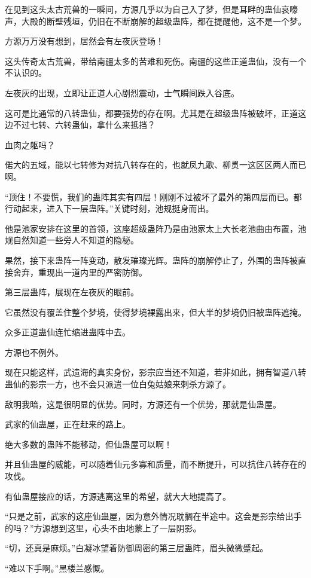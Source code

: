 \begin{this_body}
在见到这头太古荒兽的一瞬间，方源几乎以为自己入了梦，但是耳畔的蛊仙哀嚎声，大殿的断壁残垣，仍旧在不断崩解的超级蛊阵，都在提醒他，这不是一个梦。

方源万万没有想到，居然会有左夜灰登场！

这头传奇太古荒兽，带给南疆太多的苦难和死伤。南疆的这些正道蛊仙，没有一个不认识的。

左夜灰的出现，立即让正道人心剧烈震动，士气瞬间跌入谷底。

这可是比通常的八转蛊仙，都要强势的存在啊。尤其是在超级蛊阵被破坏，正道这边不过七转、六转蛊仙，拿什么来抵挡？

血肉之躯吗？

偌大的五域，能以七转修为对抗八转存在的，也就凤九歌、柳贯一这区区两人而已啊。

“顶住！不要慌，我们的蛊阵其实有四层！刚刚不过被坏了最外的第四层而已。都行动起来，进入下一层蛊阵。”关键时刻，池规挺身而出。

他是池家安排在这里的首领，这座超级蛊阵乃是由池家太上大长老池曲由布置，池规自然知道一些旁人不知道的隐秘。

果然，接下来蛊阵一阵变动，散发璀璨光辉。蛊阵的崩解停止了，外围的蛊阵被直接舍弃，重现出一道内里的严密防御。

第三层蛊阵，展现在左夜灰的眼前。

它虽然没有覆盖住整个梦境，使得梦境裸露出来，但大半的梦境仍旧被蛊阵遮掩。

众多正道蛊仙连忙缩进蛊阵中去。

方源也不例外。

现在只能这样，武遗海的真实身份，影宗应当还不知道，若非如此，拥有智道八转蛊仙的影宗一方，也不会只派遣一位白兔姑娘来刺杀方源了。

敌明我暗，这是很明显的优势。同时，方源还有一个优势，那就是仙蛊屋。

武家的仙蛊屋，正在赶来的路上。

绝大多数的蛊阵不能移动，但仙蛊屋可以啊！

并且仙蛊屋的威能，可以随着仙元多寡和质量，而不断提升，可以抗住八转存在的攻伐。

有仙蛊屋接应的话，方源逃离这里的希望，就大大地提高了。

“只是之前，武家的这座仙蛊屋，因为意外情况耽搁在半途中。这会是影宗给出手的吗？”方源想到这里，心头不由地蒙上了一层阴影。

“切，还真是麻烦。”白凝冰望着防御周密的第三层蛊阵，眉头微微蹙起。

“难以下手啊。”黑楼兰感慨。


\end{this_body}
